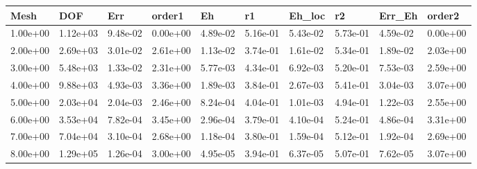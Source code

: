 \begin{tabular}{llllllllll}
Mesh & DOF & Err & order1 & Eh & r1 & Eh_loc & r2 & Err_Eh & order2 \\ 
\hline 
1.00e+00 & 1.12e+03 & 9.48e-02 & 0.00e+00 & 4.89e-02 & 5.16e-01 & 5.43e-02 & 5.73e-01 & 4.59e-02 & 0.00e+00 \\ 
2.00e+00 & 2.69e+03 & 3.01e-02 & 2.61e+00 & 1.13e-02 & 3.74e-01 & 1.61e-02 & 5.34e-01 & 1.89e-02 & 2.03e+00 \\ 
3.00e+00 & 5.48e+03 & 1.33e-02 & 2.31e+00 & 5.77e-03 & 4.34e-01 & 6.92e-03 & 5.20e-01 & 7.53e-03 & 2.59e+00 \\ 
4.00e+00 & 9.88e+03 & 4.93e-03 & 3.36e+00 & 1.89e-03 & 3.84e-01 & 2.67e-03 & 5.41e-01 & 3.04e-03 & 3.07e+00 \\ 
5.00e+00 & 2.03e+04 & 2.04e-03 & 2.46e+00 & 8.24e-04 & 4.04e-01 & 1.01e-03 & 4.94e-01 & 1.22e-03 & 2.55e+00 \\ 
6.00e+00 & 3.53e+04 & 7.82e-04 & 3.45e+00 & 2.96e-04 & 3.79e-01 & 4.10e-04 & 5.24e-01 & 4.86e-04 & 3.31e+00 \\ 
7.00e+00 & 7.04e+04 & 3.10e-04 & 2.68e+00 & 1.18e-04 & 3.80e-01 & 1.59e-04 & 5.12e-01 & 1.92e-04 & 2.69e+00 \\ 
8.00e+00 & 1.29e+05 & 1.26e-04 & 3.00e+00 & 4.95e-05 & 3.94e-01 & 6.37e-05 & 5.07e-01 & 7.62e-05 & 3.07e+00 \\ 
\hline 
\end{tabular}